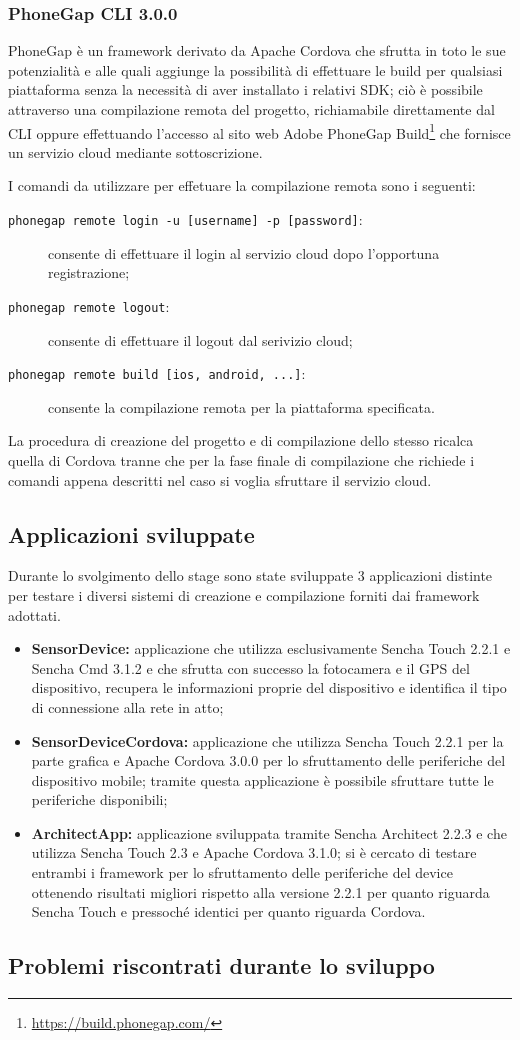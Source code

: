 \subsubsection{PhoneGap CLI 3.0.0}
PhoneGap è un framework derivato da Apache Cordova che sfrutta in toto le sue potenzialità e alle quali aggiunge la possibilità di effettuare le build per qualsiasi piattaforma senza la necessità di aver installato i relativi SDK; ciò è possibile attraverso una compilazione remota del progetto, richiamabile direttamente dal CLI oppure effettuando l'accesso al sito web Adobe PhoneGap Build\footnote{\url{https://build.phonegap.com/}} che fornisce un servizio cloud mediante sottoscrizione.

I comandi da utilizzare per effetuare la compilazione remota sono i seguenti:
\begin{description}
\item[\texttt{phonegap remote login -u [username] -p [password]}:] consente di effettuare il login al servizio cloud dopo l'opportuna registrazione;
\item[\texttt{phonegap remote logout}:] consente di effettuare il logout dal serivizio cloud;
\item[\texttt{phonegap remote build [ios, android, ...]}:] consente la compilazione remota per la piattaforma specificata.
\end{description}

La procedura di creazione del progetto e di compilazione dello stesso ricalca quella di Cordova tranne che per la fase finale di compilazione che richiede i comandi appena descritti nel caso si voglia sfruttare il servizio cloud.

\subsection{Applicazioni sviluppate}
Durante lo svolgimento dello stage sono state sviluppate 3 applicazioni distinte per testare i diversi sistemi di creazione e compilazione forniti dai framework adottati.
\begin{itemize}
\item \textbf{SensorDevice:} applicazione che utilizza esclusivamente Sencha Touch 2.2.1 e Sencha Cmd 3.1.2 e che sfrutta con successo la fotocamera e il GPS del dispositivo, recupera le informazioni proprie del dispositivo e identifica il tipo di connessione alla rete in atto;
\item \textbf{SensorDeviceCordova:} applicazione che utilizza Sencha Touch 2.2.1 per la parte grafica e Apache Cordova 3.0.0 per lo sfruttamento delle periferiche del dispositivo mobile; tramite questa applicazione è possibile sfruttare tutte le periferiche disponibili;
\item \textbf{ArchitectApp:} applicazione sviluppata tramite Sencha Architect 2.2.3 e che utilizza Sencha Touch 2.3 e Apache Cordova 3.1.0; si è cercato di testare entrambi i framework per lo sfruttamento delle periferiche del device ottenendo risultati migliori rispetto alla versione 2.2.1 per quanto riguarda Sencha Touch e pressoché identici per quanto riguarda Cordova.
\end{itemize}


\subsection{Problemi riscontrati durante lo sviluppo}



